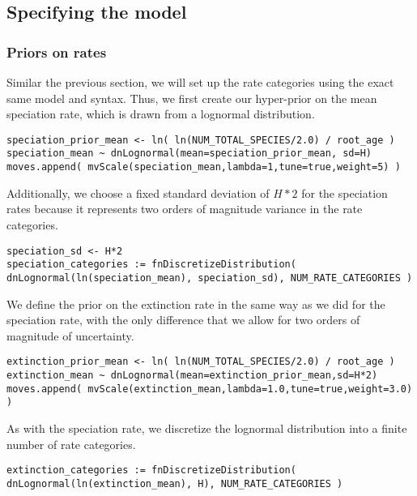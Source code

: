 \subsection{Specifying the model}

\subsubsection{Priors on rates}
Similar the previous section, we will set up the rate categories using the exact same model and \Rev syntax.
Thus, we first create our hyper-prior on the mean speciation rate, which is drawn from a lognormal distribution.
{\tt \begin{snugshade*}
\begin{lstlisting}
speciation_prior_mean <- ln( ln(NUM_TOTAL_SPECIES/2.0) / root_age )
speciation_mean ~ dnLognormal(mean=speciation_prior_mean, sd=H)
moves.append( mvScale(speciation_mean,lambda=1,tune=true,weight=5) )
\end{lstlisting}
\end{snugshade*}}
Additionally, we choose a fixed standard deviation of $H*2$ for the speciation rates because it represents two orders of magnitude variance in the rate categories.
{\tt \begin{snugshade*}
\begin{lstlisting}
speciation_sd <- H*2
speciation_categories := fnDiscretizeDistribution( dnLognormal(ln(speciation_mean), speciation_sd), NUM_RATE_CATEGORIES )
\end{lstlisting}
\end{snugshade*}}
We define the prior on the extinction rate in the same way as we did for the speciation rate, with the only difference that we allow for two orders of magnitude of uncertainty.
{\tt \begin{snugshade*}
\begin{lstlisting}
extinction_prior_mean <- ln( ln(NUM_TOTAL_SPECIES/2.0) / root_age )
extinction_mean ~ dnLognormal(mean=extinction_prior_mean,sd=H*2)
moves.append( mvScale(extinction_mean,lambda=1.0,tune=true,weight=3.0) )
\end{lstlisting}
\end{snugshade*}}

As with the speciation rate, we discretize the lognormal distribution into a finite number of rate categories.
{\tt \begin{snugshade*}
\begin{lstlisting}
extinction_categories := fnDiscretizeDistribution( dnLognormal(ln(extinction_mean), H), NUM_RATE_CATEGORIES )
\end{lstlisting}
\end{snugshade*}}


